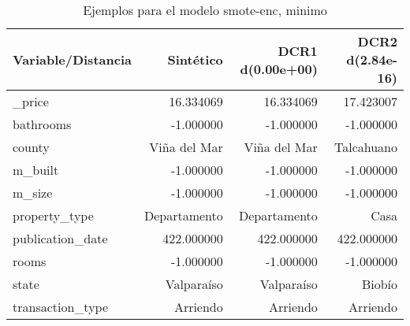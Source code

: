 \begin{table}[H]
\centering
\fontsize{10}{14}\selectfont
\caption{Ejemplos para el modelo smote-enc, minimo}
\label{table-example-economicos-b-2-smote-enc-min}
\begin{tabular}{|l|r|r|r|}
\hline
\rowcolor[gray]{0.8}
Variable/Distancia & Sintético & DCR1 d(0.00e+00) & DCR2 d(2.84e-16) \\
\hline \_price & \cellcolor[rgb]{0.9, 0.54, 0.52} 16.334069 & \cellcolor[rgb]{0.9, 0.54, 0.52} 16.334069 & 17.423007 \\
\hline bathrooms & \cellcolor[rgb]{0.9, 0.54, 0.52} -1.000000 & \cellcolor[rgb]{0.9, 0.54, 0.52} -1.000000 & \cellcolor[rgb]{0.9, 0.54, 0.52} -1.000000 \\
\hline county & \cellcolor[rgb]{0.9, 0.54, 0.52} Viña del Mar & \cellcolor[rgb]{0.9, 0.54, 0.52} Viña del Mar & Talcahuano \\
\hline m\_built & \cellcolor[rgb]{0.9, 0.54, 0.52} -1.000000 & \cellcolor[rgb]{0.9, 0.54, 0.52} -1.000000 & \cellcolor[rgb]{0.9, 0.54, 0.52} -1.000000 \\
\hline m\_size & \cellcolor[rgb]{0.9, 0.54, 0.52} -1.000000 & \cellcolor[rgb]{0.9, 0.54, 0.52} -1.000000 & \cellcolor[rgb]{0.9, 0.54, 0.52} -1.000000 \\
\hline property\_type & \cellcolor[rgb]{0.9, 0.54, 0.52} Departamento & \cellcolor[rgb]{0.9, 0.54, 0.52} Departamento & Casa \\
\hline publication\_date & \cellcolor[rgb]{0.9, 0.54, 0.52} 422.000000 & \cellcolor[rgb]{0.9, 0.54, 0.52} 422.000000 & \cellcolor[rgb]{0.9, 0.54, 0.52} 422.000000 \\
\hline rooms & \cellcolor[rgb]{0.9, 0.54, 0.52} -1.000000 & \cellcolor[rgb]{0.9, 0.54, 0.52} -1.000000 & \cellcolor[rgb]{0.9, 0.54, 0.52} -1.000000 \\
\hline state & \cellcolor[rgb]{0.9, 0.54, 0.52} Valparaíso & \cellcolor[rgb]{0.9, 0.54, 0.52} Valparaíso & Biobío \\
\hline transaction\_type & \cellcolor[rgb]{0.9, 0.54, 0.52} Arriendo & \cellcolor[rgb]{0.9, 0.54, 0.52} Arriendo & \cellcolor[rgb]{0.9, 0.54, 0.52} Arriendo \\
\hline
\end{tabular}
\end{table}
